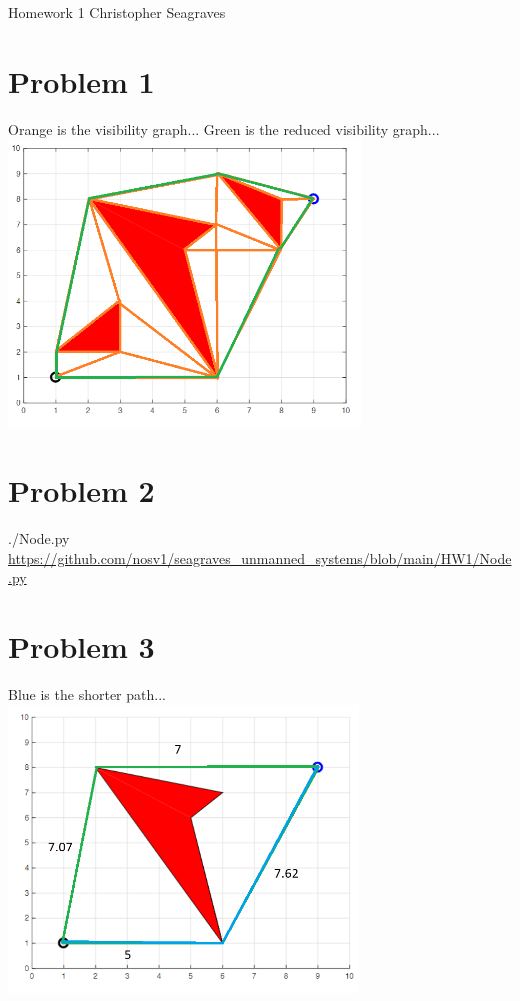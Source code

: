 \documentclass{article}
\begin{document}
\raggedright
Homework 1 \break
Christopher Seagraves

    \section*{Problem 1}
        \raggedright
        Orange is the visibility graph... \break
        Green is the reduced visibility graph... \break
        \includegraphics[height=3in]{HW1P1 Visibility Graphs.png}


    \section*{Problem 2}
        \raggedright
        ./Node.py \break
        \url{https://github.com/nosv1/seagraves_unmanned_systems/blob/main/HW1/Node.py}


    \section*{Problem 3}
        \raggedright
        Blue is the shorter path...
        \break
        \includegraphics[height=3in]{HW1P3 Reduced Visibility Graph.png}
\end{document}
